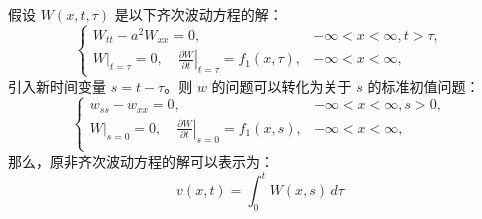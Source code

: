 \documentclass[12pt,a4paper]{article}
\numberwithin{subsection}{section}
\numberwithin{subsubsection}{subsection}
\theoremstyle{plain}
\theoremstyle{definition}
\theoremstyle{remark}
\begin{document}
	假设 \(W(x, t, \tau)\) 是以下齐次波动方程的解：
	\begin{equation}
		\begin{cases}
			W_{tt} - a^2 W_{xx} = 0, &-\infty < x < \infty, t > \tau, \\
			W|_{t=\tau} = 0, \quad \left. \frac{\partial W}{\partial t} \right|_{t=\tau} = f_1(x, \tau), & -\infty < x < \infty,
		\end{cases}
	\end{equation}
	引入新时间变量 $s = t-\tau$。则 $w$ 的问题可以转化为关于 $s$ 的标准初值问题：
\begin{equation}
	\begin{cases}
		w_{ss} - w_{xx} = 0, &-\infty < x < \infty,s > 0, \\
		W|_{s=0} = 0, \quad \left. \frac{\partial W}{\partial t} \right|_{s=0} = f_1(x, s), & -\infty < x < \infty,\\
		
	\end{cases}
\end{equation}	
	那么，原非齐次波动方程的解可以表示为：
\begin{equation}
	 v(x, t) = \int_0^t W(x, s) \, d\tau
\end{equation}
\end{document}
